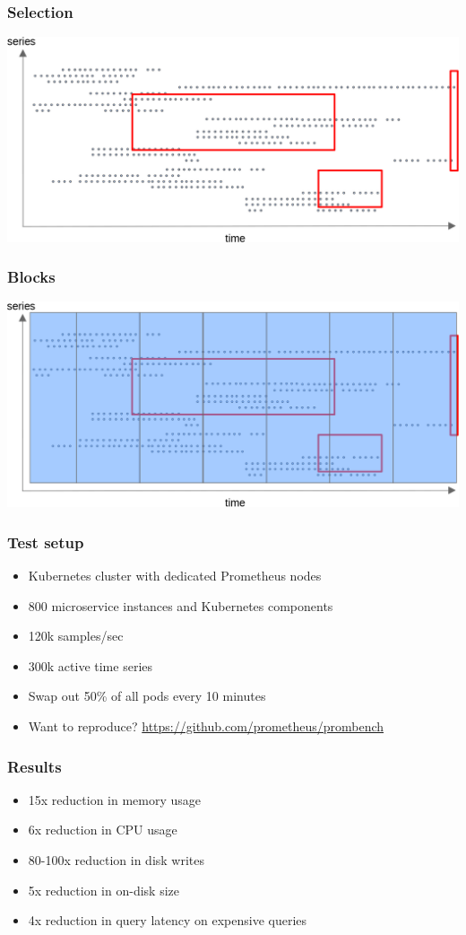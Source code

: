 \documentclass[t]{beamer}
\begin{document}
\begin{frame}
	\frametitle{Selection}
	\includegraphics[width=\textwidth]{storage--file_per_series_with_selection.png}
\end{frame}

\begin{frame}
	\frametitle{Blocks}
	\includegraphics[width=\textwidth]{storage--block_with_selection.png}
\end{frame}

\begin{frame}
	\frametitle{Test setup}
	\begin{itemize}
		\item Kubernetes cluster with dedicated Prometheus nodes
		\item 800 microservice instances and Kubernetes components
		\item 120k samples/sec
		\item 300k active time series
		\item Swap out 50\% of all pods every 10 minutes
		\item Want to reproduce? \url{https://github.com/prometheus/prombench}
	\end{itemize}
\end{frame}

\begin{frame}
	\frametitle{Results}
	\begin{itemize}
		\item 15x reduction in memory usage
		\item 6x reduction in CPU usage
		\item 80-100x reduction in disk writes
		\item 5x reduction in on-disk size
		\item 4x reduction in query latency on expensive queries
	\end{itemize}
\end{frame}
\end{document}
